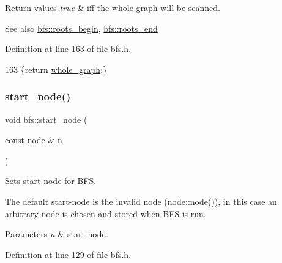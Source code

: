 \begin{DoxyRetVals}{Return values}
{\em true} & iff the whole graph will be scanned. \\
\hline
\end{DoxyRetVals}
\begin{DoxySeeAlso}{See also}
\mbox{\hyperlink{classbfs_a45d58d06d0dcd6427edad2ec52a6ebb9}{bfs\+::roots\+\_\+begin}}, \mbox{\hyperlink{classbfs_ac84b90f777adeb90390689db62602d73}{bfs\+::roots\+\_\+end}} 
\end{DoxySeeAlso}


Definition at line 163 of file bfs.\+h.


\begin{DoxyCode}
163 \{\textcolor{keywordflow}{return} \mbox{\hyperlink{classbfs_a6c08fbcc90d71f1cbdd03a1cdaa9dc99}{whole\_graph}};\}
\end{DoxyCode}
\mbox{\label{classbfs_a23e2981c2ee617a6e12a8833d2db6210}} 
\subsubsection{\texorpdfstring{start\+\_\+node()}{start\_node()}\hspace{0.1cm}{\footnotesize\ttfamily [1/2]}}
{\footnotesize\ttfamily void bfs\+::start\+\_\+node (\begin{DoxyParamCaption}\item[{const \mbox{\hyperlink{classnode}{node}} \&}]{n }\end{DoxyParamCaption})\hspace{0.3cm}{\ttfamily [inline]}}



Sets start-\/node for B\+FS. 

The default start-\/node is the invalid node (\mbox{\hyperlink{classnode_a6da4ea35f222059db9a59cf40be459f9}{node\+::node()}}), in this case an arbitrary node is chosen and stored when B\+FS is run.


\begin{DoxyParams}{Parameters}
{\em n} & start-\/node. \\
\hline
\end{DoxyParams}


Definition at line 129 of file bfs.\+h.


